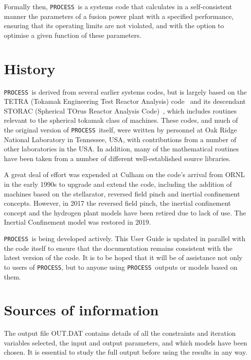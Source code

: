 \documentclass[11pt,a4paper]{report}
\newcommand{\process}{\mbox{\texttt{PROCESS}}}
\begin{document}
Formally then, \process\ is a systems code that calculates in a
self-consistent manner the parameters of a fusion power plant with a specified
performance, ensuring that its operating limits are not violated, and with the
option to optimise a given function of these parameters.

\section{History}

\process\ is derived from several earlier systems codes, but is largely based
on the TETRA (Tokamak Engineering Test Reactor Analysis) code~\cite{tetra} and
its descendant STORAC (Spherical TOrus Reactor Analysis Code)~\cite{storac},
which includes routines relevant to the spherical tokamak class of
machines. These codes, and much of the original version of \process\ itself,
were written by personnel at Oak Ridge National Laboratory in Tennessee, USA,
with contributions from a number of other laboratories in the USA\@. In
addition, many of the mathematical routines have been taken from a number of
different well-established source libraries.

A great deal of effort was expended at Culham on the code's arrival from ORNL in the early
1990s to upgrade and extend the code, including the addition of machines based on the stellarator, reversed field pinch and inertial confinement concepts. However, in 2017 the reversed field pinch, the inertial confinement concept and the hydrogen plant models have been retired due to lack of use.  The Inertial Confinement model was restored in 2019.

\process\ is being developed actively. This User Guide is updated in parallel with the 
code itself to ensure that the documentation remains consistent with
the latest version of the code. It is to be hoped that it will be of
assistance not only to users of \process, but to anyone using  \process\ outputs or models based on them.


\section{Sources of information}

The output file OUT.DAT contains details of all the constraints and iteration variables selected, the input and output parameters, and which models have been chosen. It is essential to study the full output before using the results in any way.
\end{document}
